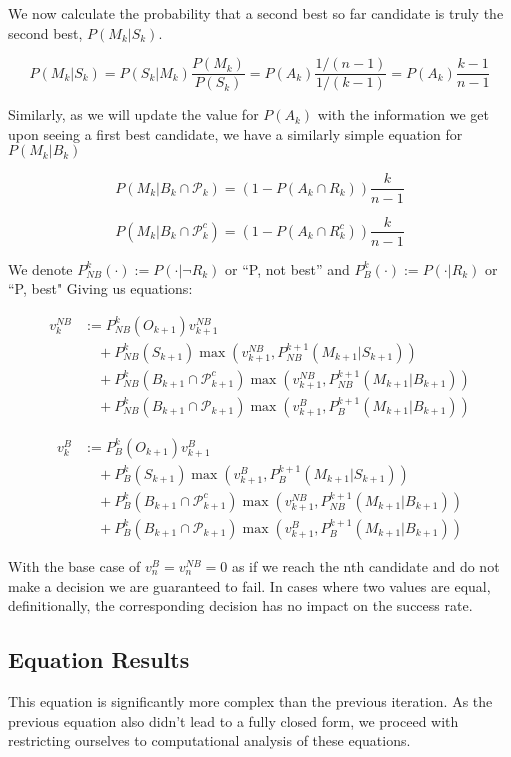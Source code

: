 \documentclass[a4paper,11pt]{article}
\begin{document}
We now calculate the probability that a second best so far candidate is truly the second best, $P(M_k|S_k)$.

$$
P(M_k|S_k) = P(S_k|M_k)\frac{P(M_k)}{P(S_k)}=P(A_k)\frac{1/(n-1)}{1/(k-1)} = P(A_k)\frac{k-1}{n-1}
$$

Similarly, as we will update the value for $P(A_k)$ with the information we get upon seeing a first best candidate, we have a similarly simple equation for $P(M_k|B_k)$

$$
P(M_k|B_k\cap \mathcal{P}_k) = (1-P(A_k\cap R_k))\frac{k}{n-1}
$$

$$
P(M_k |B_k\cap\mathcal{P}_k^c) = (1-P(A_k\cap R_k^c))\frac{k}{n-1}
$$


We denote $P_{NB}^k(\cdot) := P(\cdot | \neg R_k)$ or ``P, not best''  and $P_{B}^k(\cdot) := P(\cdot | R_k)$ or ``P, best"
Giving us equations:

\begin{align*}
v_k^{NB} &:= P_{NB}^k(O_{k+1}) v_{k+1}^{NB} \\
      &\quad + P_{NB}^k(S_{k+1})\max\left(v_{k+1}^{NB},P_{NB}^{k+1}(M_{k+1}|S_{k+1})\right) \\
      &\quad + P_{NB}^k(B_{k+1} \cap \mathcal{P}_{k+1}^c)\max\left(v_{k+1}^{NB},P_{NB}^{k+1}(M_{k+1}|B_{k+1})\right) \\
      &\quad + P_{NB}^k(B_{k+1} \cap \mathcal{P}_{k+1})\max\left(v_{k+1}^{B},P_{B}^{k+1}(M_{k+1}|B_{k+1})\right)
\end{align*}


\begin{align*}
v_k^{B} &:= P_{B}^k(O_{k+1}) v_{k+1}^{B} \\
      &\quad + P_{B}^k(S_{k+1})\max\left(v_{k+1}^{B},P_{B}^{k+1}(M_{k+1}|S_{k+1})\right) \\
      &\quad + P_{B}^k(B_{k+1} \cap \mathcal{P}_{k+1}^c)\max\left(v_{k+1}^{NB},P_{NB}^{k+1}(M_{k+1}|B_{k+1})\right) \\
      &\quad + P_{B}^k(B_{k+1} \cap \mathcal{P}_{k+1})\max\left(v_{k+1}^{B},P_{B}^{k+1}(M_{k+1}|B_{k+1})\right)
\end{align*}


With the base case of $v_{n}^{B} = v_{n}^{NB} = 0$ as if we reach the nth candidate and do not make a decision we are guaranteed to fail. In cases where two values are equal, definitionally, the corresponding decision has no impact on the success rate.


\subsection{Equation Results}
\label{sec:Equation-Results}
This equation is significantly more complex than the previous iteration. As the previous equation also didn't lead to a fully closed form, we proceed with restricting ourselves to computational analysis of these equations.
\end{document}

